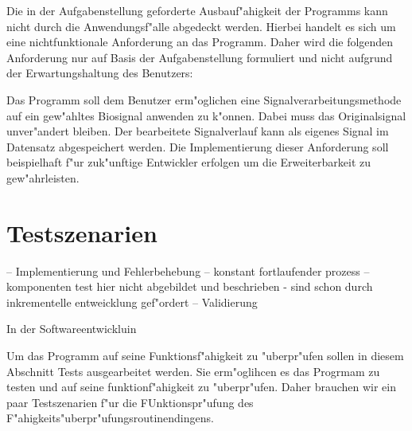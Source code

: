 Die in der Aufgabenstellung geforderte Ausbauf"ahigkeit der Programms kann nicht durch die Anwendungsf"alle abgedeckt werden.
Hierbei handelt es sich um eine nichtfunktionale Anforderung an das Programm.
Daher wird die folgenden Anforderung nur auf Basis der Aufgabenstellung formuliert und nicht aufgrund der Erwartungshaltung des Benutzers:
\begin{enumerate}[resume]
	 Das Programm soll dem Benutzer erm"oglichen eine Signalverarbeitungsmethode auf ein gew"ahltes Biosignal anwenden zu k"onnen.
							Dabei muss das Originalsignal unver"andert bleiben.
							Der bearbeitete Signalverlauf kann als eigenes Signal im Datensatz abgespeichert werden.
							Die Implementierung dieser Anforderung soll beispielhaft f"ur zuk"unftige Entwickler erfolgen um die Erweiterbarkeit zu gew"ahrleisten.
\end{enumerate}

\section{Testszenarien}

-- Implementierung und Fehlerbehebung
-- konstant fortlaufender prozess
-- komponenten test hier nicht abgebildet und beschrieben - sind schon durch inkrementelle entweicklung gef"ordert
-- Validierung

In der Softwareentwickluin

Um das Programm auf seine Funktionsf"ahigkeit zu "uberpr"ufen sollen in diesem Abschnitt Tests ausgearbeitet werden.
Sie erm"oglihcen es das Progrmam zu testen und auf seine funktionf"ahigkeit zu "uberpr"ufen.
Daher brauchen wir ein paar Testszenarien f"ur die FUnktionspr"ufung des F"ahigkeits"uberpr"ufungsroutinendingens.


